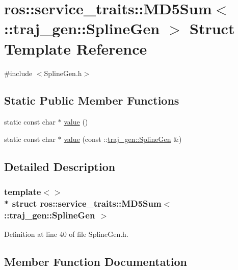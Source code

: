 \hypertarget{structros_1_1service__traits_1_1_m_d5_sum_3_01_1_1traj__gen_1_1_spline_gen_01_4}{}\section{ros\+:\+:service\+\_\+traits\+:\+:M\+D5\+Sum$<$ \+:\+:traj\+\_\+gen\+:\+:Spline\+Gen $>$ Struct Template Reference}
\label{structros_1_1service__traits_1_1_m_d5_sum_3_01_1_1traj__gen_1_1_spline_gen_01_4}


{\ttfamily \#include $<$Spline\+Gen.\+h$>$}

\subsection*{Static Public Member Functions}
\begin{DoxyCompactItemize}
\item 
static const char $\ast$ \hyperlink{structros_1_1service__traits_1_1_m_d5_sum_3_01_1_1traj__gen_1_1_spline_gen_01_4_ab73d9b73e5318040ddbf86d5ece66e3f}{value} ()
\item 
static const char $\ast$ \hyperlink{structros_1_1service__traits_1_1_m_d5_sum_3_01_1_1traj__gen_1_1_spline_gen_01_4_a02f3eb96e86e797da63ac00cd8726cf5}{value} (const \+::\hyperlink{structtraj__gen_1_1_spline_gen}{traj\+\_\+gen\+::\+Spline\+Gen} \&)
\end{DoxyCompactItemize}


\subsection{Detailed Description}
\subsubsection*{template$<$$>$\\*
struct ros\+::service\+\_\+traits\+::\+M\+D5\+Sum$<$ \+::traj\+\_\+gen\+::\+Spline\+Gen $>$}



Definition at line 40 of file Spline\+Gen.\+h.



\subsection{Member Function Documentation}
